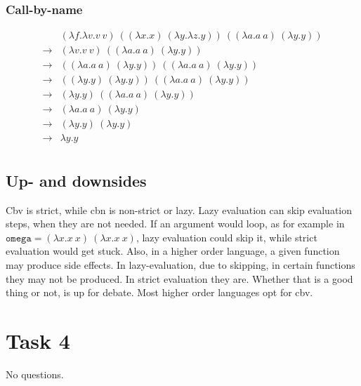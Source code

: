\documentclass[13pt, a4paper]{article}
\begin{document}
\subsubsection*{Call-by-name}
\[
\begin{array}{llr}
& (\lambda f.\lambda v. v\ v)\ ((\lambda x.x)\ (\lambda y.\lambda z.y))\ ((\lambda a.a\ a)\ (\lambda y.y)) \\
\to & (\lambda v. v\ v)\ ((\lambda a.a\ a)\ (\lambda y.y)) \\
\to & ((\lambda a.a\ a)\ (\lambda y.y))\ ((\lambda a.a\ a)\ (\lambda y.y)) \\
\to & ((\lambda y.y)\ (\lambda y.y))\ ((\lambda a.a\ a)\ (\lambda y.y)) \\
\to & (\lambda y.y)\ ((\lambda a.a\ a)\ (\lambda y.y)) \\
\to & (\lambda a.a\ a)\ (\lambda y.y) \\
\to & (\lambda y.y)\ (\lambda y.y) \\
\to & \lambda y.y \\
\end{array}
\]

\subsection*{Up- and downsides} %

Cbv is strict, while cbn is non-strict or lazy. Lazy evaluation can skip evaluation steps, when they are not needed. If an argument would loop, as for example in $\texttt{omega} = (\lambda x.x\ x)\ (\lambda x.x\ x)$, lazy evaluation could skip it, while strict evaluation would get stuck. Also, in a higher order language, a given function may produce side effects. In lazy-evaluation, due to skipping, in certain functions they may not be produced. In strict evaluation they are. Whether that is a good thing or not, is up for debate. Most higher order languages opt for cbv.

\section*{Task 4}

No questions.
\end{document}
